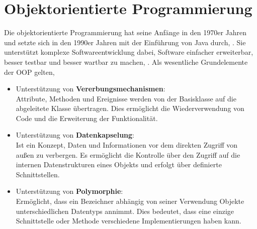 \chapter{Objektorientierte Programmierung}

Die objektorientierte Programmierung hat seine Anfänge in den 1970er Jahren und setzte sich in den 1990er Jahren mit der Einführung von Java durch, \cite{Steyer:2018}. Sie unterstützt komplexe Softwareentwicklung dabei, Software einfacher erweiterbar, besser testbar und besser wartbar zu machen, \cite{Lahres:2021}. Als wesentliche Grundelemente der OOP gelten, \cite{Lahres:2021}
\begin{itemize}
	\itemsep0pt
	\item Unterstützung von \textbf{Vererbungsmechanismen}: \\
	Attribute, Methoden und Ereignisse werden von der Basisklasse auf die abgeleitete Klasse übertragen. Dies ermöglicht die Wiederverwendung von Code und die Erweiterung der Funktionalität.
	\item Unterstützung von \textbf{Datenkapselung}: \\
	Ist ein Konzept, Daten und Informationen vor dem direkten Zugriff von außen zu verbergen. Es ermöglicht die Kontrolle über den Zugriff auf die internen Datenstrukturen eines Objekts und erfolgt über definierte Schnittstellen.
	\item Unterstützung von \textbf{Polymorphie}: \\
	Ermöglicht, dass ein Bezeichner abhängig von seiner Verwendung Objekte unterschiedlichen Datentyps annimmt. Dies bedeutet, dass eine einzige Schnittstelle oder Methode verschiedene Implementierungen haben kann.
\end{itemize}

